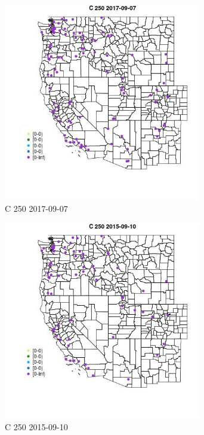 \begin{figure} 
\centering  
\includegraphics[width=0.77\textwidth]{Code_Outputs/Report_ML_input_PM25_Step4_part_e_de_duplicated_aveswNAs_MapObsC_2502017-09-07.jpg} 
\caption{\label{fig:Report_ML_input_PM25_Step4_part_e_de_duplicated_aveswNAsMapObsC_2502017-09-07}C 250 2017-09-07} 
\end{figure} 
 

\begin{figure} 
\centering  
\includegraphics[width=0.77\textwidth]{Code_Outputs/Report_ML_input_PM25_Step4_part_e_de_duplicated_aveswNAs_MapObsC_2502015-09-10.jpg} 
\caption{\label{fig:Report_ML_input_PM25_Step4_part_e_de_duplicated_aveswNAsMapObsC_2502015-09-10}C 250 2015-09-10} 
\end{figure} 
 

